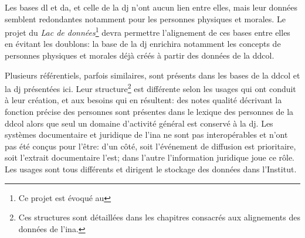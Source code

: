 Les bases \ac{dl} et \ac{da}, et celle de la \ac{dj} n'ont aucun lien entre elles, mais leur données semblent redondantes notamment pour les personnes physiques et morales. Le projet du \textit{Lac de données}\footnote{Ce projet est évoqué au } devra permettre l'alignement de ces bases entre elles en évitant les doublons: la base de la \ac{dj} enrichira notamment les concepts de personnes physiques et morales déjà créés à partir des données de la \ac{ddcol}.

\bigskip
\bigskip

Plusieurs référentiels, parfois similaires, sont présents dans les bases de la \ac{ddcol} et la \ac{dj} présentées ici. Leur structure\footnote{Ces structures sont détaillées dans les chapitres consacrés aux alignements des données de l'\ac{ina}.} est différente selon les usages qui ont conduit à leur création, et aux besoins qui en résultent: des notes qualité décrivant la fonction précise des personnes sont présentes dans le lexique des personnes de la \ac{ddcol} alors que seul un domaine d'activité général est conservé à la \ac{dj}. Les systèmes documentaire et juridique de l'\ac{ina} ne sont pas interopérables et n'ont pas été conçus pour l'être: d'un côté, soit l'événement de diffusion est prioritaire, soit l'extrait documentaire l'est; dans l'autre l'information juridique joue ce rôle. Les usages sont tous différents et dirigent le stockage des données dans l'Institut.